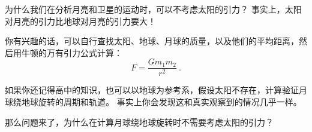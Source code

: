 
为什么我们在分析月亮和卫星的运动时，可以不考虑太阳的引力？ 事实上，太阳对月亮的引力比地球对月亮的引力要大！

你有兴趣的话，可以自行查找太阳、地球、月球的质量，以及他们的平均距离，然后用牛顿的万有引力公式计算：
\begin{equation}
F = \frac{Gm_1m_2}{r^2}~.
\end{equation}

如果你还记得高中的知识，也可以以地球为参考系，假设太阳不存在，计算验证月球绕地球旋转的周期和轨道。 事实上你会发现这和真实观察到的情况几乎一样。

那么问题来了，为什么在计算月球绕地球旋转时不需要考虑太阳的引力？
